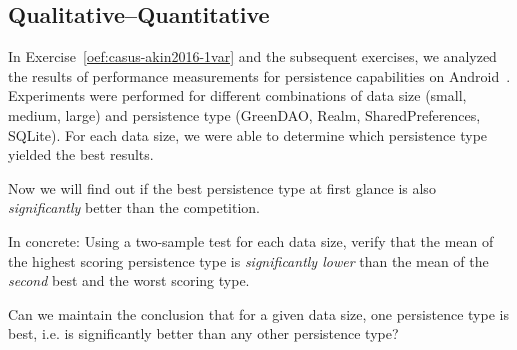 \subsection{Qualitative--Quantitative}
\label{ssec:ex-qualitative-quantitative}

\begin{exercise}
  \label{ex:casus-akin2016-toets}
  
  In Exercise~\ref{oef:casus-akin2016-1var} and the subsequent exercises, we analyzed the results of performance measurements for persistence capabilities on Android~\autocite{Akin2016}. Experiments were performed for different combinations of data size (small, medium, large) and persistence type (GreenDAO, Realm, SharedPreferences, SQLite). For each data size, we were able to determine which persistence type yielded the best results. 
  
  Now we will find out if the best persistence type at first glance is also \emph{significantly} better than the competition.
  
  In concrete: Using a two-sample test for each data size, verify that the mean of the highest scoring persistence type is \emph{significantly lower} than the mean of the \emph{second} best and the worst scoring type.
  
  Can we maintain the conclusion that for a given data size, one persistence type is best, i.e. is significantly better than any other persistence type?
\end{exercise}

